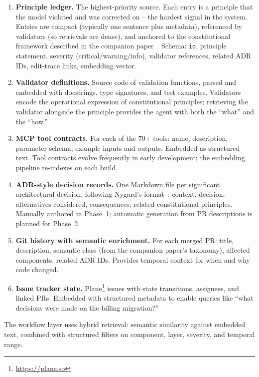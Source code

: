 \documentclass[11pt]{article}
\begin{document}
\begin{enumerate}[leftmargin=*, nosep]
  \item \textbf{Principle ledger.} The highest-priority source. Each entry is a principle that the model violated and was corrected on -- the hardest signal in the system. Entries are compact (typically one sentence plus metadata), referenced by validators (so retrievals are dense), and anchored to the constitutional framework described in the companion paper~\citep[\S5]{ovcharov2026recursive}. Schema: \texttt{id}, principle statement, severity (critical/warning/info), validator references, related ADR IDs, edit-trace links, embedding vector.

  \item \textbf{Validator definitions.} Source code of validation functions, parsed and embedded with docstrings, type signatures, and test examples. Validators encode the operational expression of constitutional principles; retrieving the validator alongside the principle provides the agent with both the ``what'' and the ``how.''

  \item \textbf{MCP tool contracts.} For each of the 70+ tools: name, description, parameter schema, example inputs and outputs. Embedded as structured text. Tool contracts evolve frequently in early development; the embedding pipeline re-indexes on each build.

  \item \textbf{ADR-style decision records.} One Markdown file per significant architectural decision, following Nygard's format~\citep{nygard2011adr}: context, decision, alternatives considered, consequences, related constitutional principles. Manually authored in Phase~1; automatic generation from PR descriptions is planned for Phase~2.

  \item \textbf{Git history with semantic enrichment.} For each merged PR: title, description, semantic class (from the companion paper's taxonomy), affected components, related ADR IDs. Provides temporal context for when and why code changed.

  \item \textbf{Issue tracker state.} Plane\footnote{\url{https://plane.so}} issues with state transitions, assignees, and linked PRs. Embedded with structured metadata to enable queries like ``what decisions were made on the billing migration?''
\end{enumerate}

The workflow layer uses hybrid retrieval: semantic similarity against embedded text, combined with structured filters on component, layer, severity, and temporal range.
\end{document}
